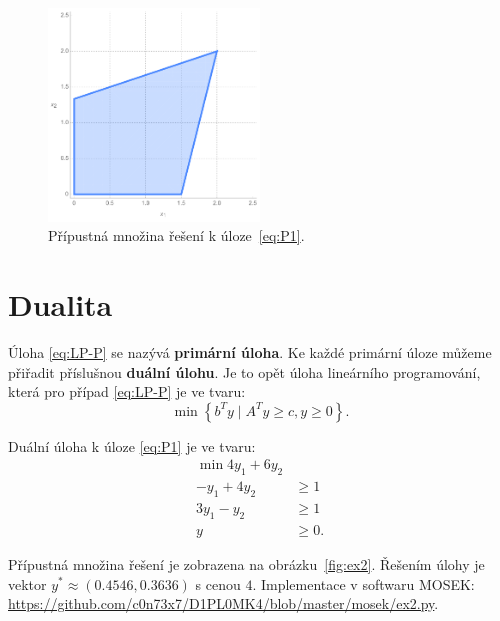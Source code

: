 \begin{figure}[h!]
    \centering
    \includegraphics[width=0.5\textwidth]{img/ex1.png}   
    \caption{Přípustná množina řešení k úloze~\ref{eq:P1}.}
    \label{fig:ex1}
\end{figure}

\section{Dualita}
Úloha \ref{eq:LP-P} se nazývá \textbf{primární úloha}. Ke každé primární úloze můžeme přiřadit příslušnou \textbf{duální úlohu}. Je to opět úloha lineárního programování, která pro případ \ref{eq:LP-P} je ve tvaru:
\begin{equation}\tag{LP-D}
    \min \left\{ b^T y \mid A^T y \geq c, y \geq 0 \right\}.
    \label{eq:LP-D}
\end{equation}

\begin{pr}
Duální úloha k úloze \ref{eq:P1} je ve tvaru:
\begin{equation}\tag{P2}
    \begin{split}
        \min 4 y_1 + 6 y_2  & \\
        - y_1 + 4 y_2       &\geq 1 \\
        3 y_1 -   y_2       &\geq 1 \\
        y &\geq 0.
    \end{split}
    \label{eq:P2}
\end{equation}

Přípustná množina řešení je zobrazena na obrázku~\ref{fig:ex2}. Řešením úlohy je vektor $y^* \approx (0.4546, 0.3636)$ s cenou $4$. Implementace v softwaru MOSEK: \url{https://github.com/c0n73x7/D1PL0MK4/blob/master/mosek/ex2.py}.
\end{pr}

